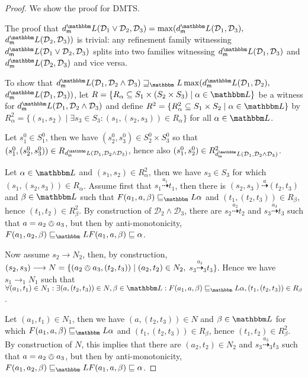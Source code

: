 \documentclass[twocolumn]{svjour3-dummy}
\newcommand*\oland{\owedge}
\newcommand*{\must}[1]{\overset{#1}{\longrightarrow}}
\newcommand*\cD{\mathcal D}
\newcommand*{\may}[1]{\overset{#1}{\dashrightarrow}}
\newcommand*\LL{\mathbbm L}
\begin{document}
\begin{proof}We show the proof for DMTS.

  The proof that $\mdl( \cD_1\lor \cD_2, \cD_3)= \max( \mdl( \cD_1,
  \cD_3),$ $\mdl( \cD_2, \cD_3))$ is trivial: any refinement family
  witnessing $\mdl( \cD_1\lor \cD_2, \cD_3)$ splits into two families
  witnessing $\mdl( \cD_1, \cD_3)$ and $\mdl( \cD_2, \cD_3)$ and vice
  versa.

  To show that $\mdl( \cD_1, \cD_2\land \cD_3)\sqsupseteq_\LL \max(
  \mdl( \cD_1, \cD_2),$ $\mdl( \cD_1, \cD_3))$, let $R=\{
  R_\alpha\subseteq S_1\times( S_2\times S_3)\mid \alpha\in \LL\}$ be a
  witness for $\mdl( \cD_1, \cD_2\land \cD_3)$ and define $R^2=\{
  R^2_\alpha\subseteq S_1\times S_2\mid \alpha\in \LL\}$ by
  $R^2_\alpha=\{( s_1, s_2)\mid \exists s_3\in S_3:( s_1,( s_2, s_3))\in
  R_\alpha\}$ for all $\alpha\in \LL$.

  Let $s_1^0\in S_1^0$, then we have $( s_2^0, s_3^0)\in S_2^0\times
  S_3^0$ so that $( s_1^0,( s_2^0, s_3^0))\in R_{ \mdl( \cD_1,
    \cD_2\land \cD_3)}$, hence also $( s_1^0, s_2^0)\in R^2_{ \mdl(
    \cD_1, \cD_2\land \cD_3)}$.

  Let $\alpha\in \LL$ and $( s_1, s_2)\in R^2_\alpha$, then we have
  $s_3\in S_3$ for which $( s_1,( s_2, s_3))\in R_\alpha$.  Assume first
  that $s_1\may{ a_1} t_1$, then there is $( s_2, s_3)\may a( t_2, t_3)$
  and $\beta\in \LL$ such that $F( a_1, a, \beta)\sqsubseteq_\LL \alpha$
  and $( t_1,( t_2, t_3))\in R_\beta$, hence $( t_1, t_2)\in
  R^2_\beta$.  By construction of $\cD_2\land \cD_3$, there are
  $s_2\may{ a_2} t_2$ and $s_3\may{ a_3} t_3$ such that $a= a_2\oland
  a_3$, but then by anti-monotonicity, $F( a_1, a_2,
  \beta)\sqsubseteq_\LL F( a_1, a, \beta)\sqsubseteq \alpha$.

  Now assume $s_2\must{} N_2$, then, by
  construction,\linebreak[4]$( s_2, s_3)\must{} N=\{( a_2\oland a_3,( t_2, t_3))\mid( a_2,
  t_2)\in N_2,$ $s_3\may{ a_3}_3 t_3\}$.  Hence we have $s_1\must{}_1
  N_1$ such that $\forall( a_1, t_1)\in N_1: \exists( a,( t_2,
  t_3))\in N, \beta\in \LL: F( a_1, a, \beta)\sqsubseteq_\LL \alpha,(
  t_1,( t_2, t_3))\in R_\beta$.

  Let $( a_1, t_1)\in N_1$, then we have $( a,( t_2, t_3))\in N$ and
  $\beta\in \LL$ for which $F( a_1, a, \beta)\sqsubseteq_\LL \alpha$ and
  $( t_1,( t_2, t_3))\in R_\beta$, hence $( t_1, t_2)\in R^2_\beta$.  By
  construction of $N$, this implies that there are $( a_2, t_2)\in N_2$
  and $s_3\may{ a_3}_3 t_3$ such that $a= a_2\oland a_3$, but then by
  anti-monotonicity, $F( a_1, a_2, \beta)\sqsubseteq_\LL F( a_1, a,
  \beta)\sqsubseteq \alpha$.


\end{proof}
\end{document}
